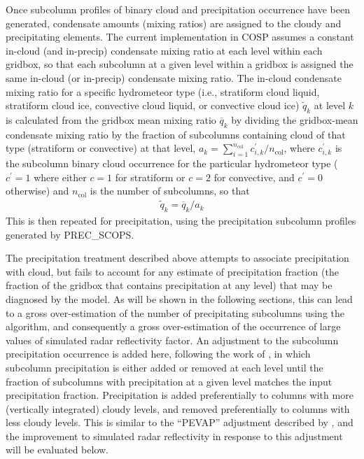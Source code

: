 Once subcolumn profiles of binary cloud and precipitation occurrence
have been generated, condensate amounts (mixing ratios) are assigned to
the cloudy and precipitating elements. The current implementation in
COSP assumes a constant in-cloud (and in-precip) condensate mixing ratio
at each level within each gridbox, so that each subcolumn at a given
level within a gridbox is assigned the same in-cloud (or in-precip)
condensate mixing ratio. The in-cloud condensate mixing ratio for a
specific hydrometeor type (i.e., stratiform cloud liquid, stratiform
cloud ice, convective cloud liquid, or convective cloud ice)
\(\tilde{q}_k\) at level \(k\) is calculated from the gridbox mean
mixing ratio \(\overline{q}_k\) by dividing the gridbox-mean condensate
mixing ratio by the fraction of subcolumns containing cloud of that type
(stratiform or convective) at that level,
\(a_k = \sum_{i = 1}^{n_\textrm{col}} c^\prime_{i, k} / n_\textrm{col}\),
where \(c^{\prime}_{i, k}\) is the subcolumn binary cloud occurrence for
the particular hydrometeor type (\(c^\prime = 1\) where either \(c = 1\)
for stratiform or \(c = 2\) for convective, and \(c^\prime = 0\)
otherwise) and \(n_\textrm{col}\) is the number of subcolumns, so that
\[\begin{gathered} 
    \tilde{q}_k = \overline{q}_k / a_k
\end{gathered}\] This is then repeated for precipitation, using the
precipitation subcolumn profiles generated by PREC\_SCOPS.

The precipitation treatment described above attempts to associate
precipitation with cloud, but fails to account for any estimate of
precipitation fraction (the fraction of the gridbox that contains
precipitation at any level) that may be diagnosed by the model. As will
be shown in the following sections, this can lead to a gross
over-estimation of the number of precipitating subcolumns using the
\citet{zhang_et_al_2010} algorithm, and consequently a gross
over-estimation of the occurrence of large values of simulated radar
reflectivity factor. An adjustment to the subcolumn precipitation
occurrence is added here, following the work of
\citet{dimichele_et_al_2012}, in which subcolumn precipitation is either
added or removed at each level until the fraction of subcolumns with
precipitation at a given level matches the input precipitation fraction.
Precipitation is added preferentially to columns with more (vertically
integrated) cloudy levels, and removed preferentially to columns with
less cloudy levels. This is similar to the ``PEVAP'' adjustment
described by \citet{dimichele_et_al_2012}, and the improvement to
simulated radar reflectivity in response to this adjustment will be
evaluated below.


